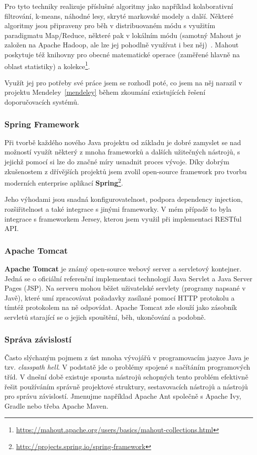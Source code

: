 \documentclass[thesis=M,czech]{FITthesis}[2014/05/07]
\begin{document}
Pro tyto techniky realizuje příslušné algoritmy jako například kolaborativní filtrování, k-means, náhodné lesy, skryté markovské modely a další. Některé algoritmy jsou připraveny pro běh v distribuovaném módu s využitím paradigmatu Map/Reduce, některé pak v lokálním módu (samotný Mahout je založen na Apache Hadoop, ale lze jej pohodlně využívat i bez něj)~\cite{mahouttut}. Mahout poskytuje též knihovny pro obecné matematické operace (zaměřené hlavně na oblast statistiky) a kolekce\footnote{\url{https://mahout.apache.org/users/basics/mahout-collections.html}}. 

Využít jej pro potřeby své práce jsem se rozhodl poté, co jsem na něj narazil v projektu Mendeley~\ref{mendeley} během zkoumání existujících řešení doporučovacích systémů. 

\subsubsection{Spring Framework}
Při tvorbě každého nového Java projektu od základu je dobré zamyslet se nad možností využít některý z mnoha frameworků a dalších užitečných nástrojů, s jejichž pomocí si lze do značné míry usnadnit proces vývoje. Díky dobrým zkušenostem z dřívějších projektů jsem zvolil open-source framework pro tvorbu moderních enterprise aplikací \textbf{Spring}\footnote{\url{http://projects.spring.io/spring-framework}}. 

Jeho výhodami jsou snadná konfigurovatelnost, podpora dependency injection, rozšiřitelnost a také integrace s jinými frameworky. V mém případě to byla integrace s frameworkem Jersey, kterou jsem využil při implementaci RESTful API.

\subsubsection{Apache Tomcat}
\textbf{Apache Tomcat} je známý open-source webový server a servletový kontejner. Jedná se o oficiální referenční implementaci technologií Java Servlet a Java Server Pages (JSP). Na serveru mohou běžet uživatelské servlety (programy napsané v Javě), které umí zpracovávat požadavky zasílané pomocí HTTP protokolu a tímtéž protokolem na ně odpovídat. Apache Tomcat zde slouží jako zásobník servletů starající se o jejich spouštění, běh, ukončování a podobně.

\subsubsection{Správa závislostí}
Často slýchaným pojmem z úst mnoha vývojářů v programovacím jazyce Java je tzv. \emph{classpath hell}. V podstatě jde o problémy spojené s načítáním programových tříd. V dnešní době existuje spousta nástrojů schopných tento problém efektivně řešit používáním správně projektové struktury, sestavovacích nástrojů a nástrojů pro správu závislostí. Jmenujme například Apache Ant společně s Apache Ivy, Gradle nebo třeba Apache Maven.
\end{document}

